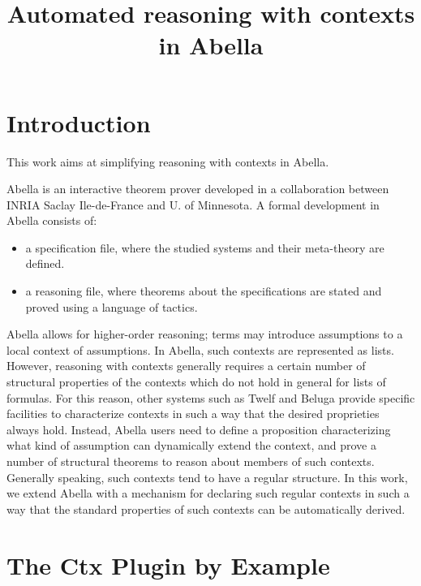 \documentclass[nocopyrightspace,authoryear]{sigplanconf}
\title{Automated reasoning with contexts in Abella}
\begin{document}
\maketitle
\section{Introduction}
This work aims at simplifying reasoning with contexts in Abella.

Abella \cite{abellasys, abellanew} is an interactive theorem prover developed in a collaboration between INRIA Saclay Ile-de-France and U. of Minnesota. A formal development in Abella consists of:
\begin{itemize}
\item a specification file, where the studied systems and their meta-theory are defined.
\item a reasoning file, where theorems about the specifications are stated and proved using a language of tactics.
\end{itemize}

Abella allows for higher-order reasoning; terms may introduce assumptions to a local context of assumptions. In Abella, such contexts are represented as lists. However, reasoning with contexts generally requires a certain number of structural properties of the contexts which do not hold in general for lists of formulas. For this reason, other systems such as Twelf \cite{twelfsys} and Beluga \cite{belugasys} provide specific facilities to characterize contexts in such a way that the desired proprieties always hold. Instead, Abella users need to define a proposition characterizing what kind of assumption can dynamically extend the context, and prove a number of structural theorems to reason about members of such contexts.
Generally speaking, such contexts tend to have a regular structure. In this work, we extend Abella with a mechanism for declaring such regular contexts in such a way that the standard properties of such contexts can be automatically derived.

\section{The Ctx Plugin by Example}
\end{document}

